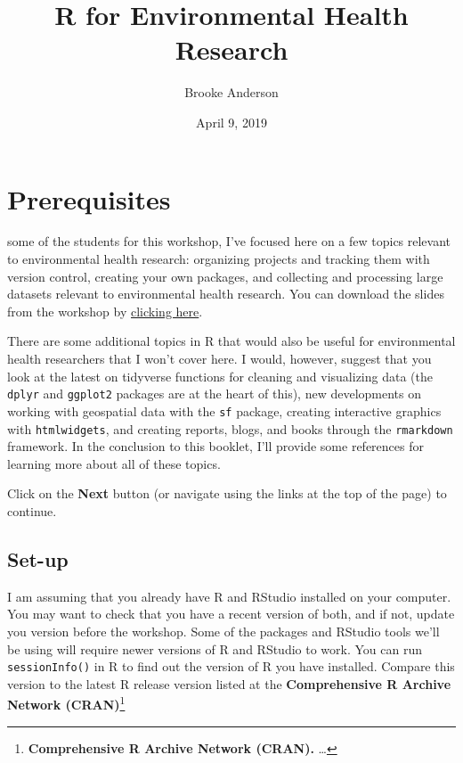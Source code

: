 \documentclass[]{tufte-book}
\title{R for Environmental Health Research}
\author{Brooke Anderson}
\date{April 9, 2019}
\begin{document}
\maketitle



{
\setcounter{tocdepth}{1}
\tableofcontents
}

\hypertarget{prerequisites}{%
\chapter{Prerequisites}\label{prerequisites}}

 some of the students for this
workshop, I've focused here on a few topics relevant to environmental health
research: organizing projects and tracking them with version control, creating
your own packages, and collecting and processing large datasets relevant to
environmental health research. You can download the slides from the workshop by
\href{https://github.com/geanders/columbia_env_health/raw/master/_workshop_slides/workshop_slides.pdf}{clicking
here}.

There are some additional topics in R that would also be useful for
environmental health researchers that I won't cover here. I would, however,
suggest that you look at the latest on tidyverse functions for cleaning and
visualizing data (the \texttt{dplyr} and \texttt{ggplot2} packages are at the heart of this),
new developments on working with geospatial data with the \texttt{sf} package, creating
interactive graphics with \texttt{htmlwidgets}, and creating reports, blogs, and books
through the \texttt{rmarkdown} framework. In the conclusion to this booklet, I'll
provide some references for learning more about all of these topics.

Click on the \textbf{Next} button (or navigate using the
links at the top of the page) to continue.

\hypertarget{set-up}{%
\section{Set-up}\label{set-up}}

I am assuming that you already have R and RStudio installed on your computer.
You may want to check that you have a recent version of both, and if not, update
you version before the workshop. Some of the packages and RStudio tools we'll be
using will require newer versions of R and RStudio to work. You can run
\texttt{sessionInfo()} in R to find out the version of R you have installed. Compare
this version to the latest R release version listed at the \textbf{Comprehensive R
Archive Network (CRAN)}\footnote{\textbf{Comprehensive R Archive Network (CRAN).} \ldots{}}
\end{document}
